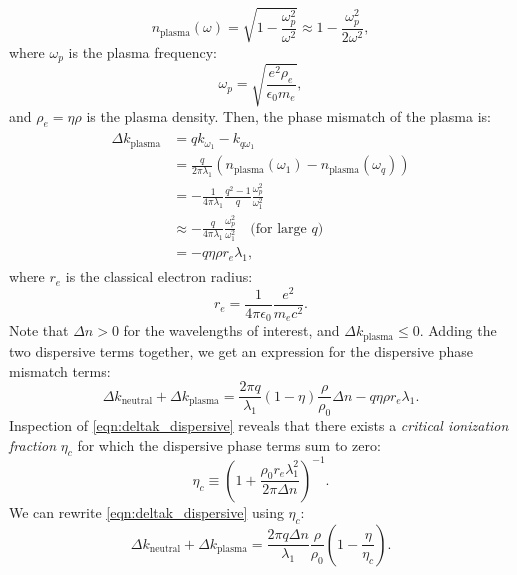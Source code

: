 \begin{equation}
n_{\textrm{plasma}}(\omega) = \sqrt{1 - \frac{\omega_p^2}{\omega^2}} \approx 1 - \frac{\omega_p^2}{2 \omega^2},
\end{equation}
where $\omega_p$ is the plasma frequency:
\begin{equation}
\omega_p = \sqrt{\frac{e^2 \rho_e}{\epsilon_0 m_e}},
\end{equation} and $\rho_e = \eta \rho$ is the plasma density. Then, the phase mismatch of the plasma is:
\begin{align}
\begin{split}
\Delta k_{\textrm{plasma}} &= q k_{\omega_1} - k_{q \omega_1} \\
&= \frac{q}{2 \pi \lambda_1} (n_{\textrm{plasma}}(\omega_1) -n_{\textrm{plasma}}(\omega_q) ) \\
&= - \frac{1}{4 \pi \lambda_1} \frac{q^2-1}{q} \frac{\omega_p^2}{\omega_1^2} \\
&\approx - \frac{q}{4 \pi \lambda_1} \frac{\omega_p^2}{\omega_1^2} \quad \textrm{(for large $q$)} \\
&= - q \eta \rho  r_e \lambda_1,
\end{split}
\end{align}
where $r_e$ is the classical electron radius:
\begin{equation}
r_e = \frac{1}{4 \pi \epsilon_0} \frac{e^2}{m_e c^2}.
\end{equation}
Note that $\Delta n > 0$ for the wavelengths of interest, and $\Delta k_{\textrm{plasma}} \le 0$. Adding the two dispersive terms together, we get an expression for the dispersive phase mismatch terms:
\begin{equation}
\Delta k_{\textrm{neutral}} + \Delta k_{\textrm{plasma}} = \frac{2 \pi q}{\lambda_1} (1-\eta) \frac{\rho}{\rho_0}\Delta n - q \eta \rho  r_e \lambda_1.
\label{eqn:deltak_dispersive}
\end{equation}
Inspection of \cref{eqn:deltak_dispersive} reveals that there exists a \textit{critical ionization fraction} $\eta_c$ for which the dispersive phase terms sum to zero:
\begin{equation}
\eta_c \equiv \left( 1+ \frac{\rho_0 r_e \lambda_1^2}{2 \pi \Delta n} \right)^{-1}.
\end{equation}
We can rewrite \cref{eqn:deltak_dispersive} using $\eta_c$:
\begin{equation}
\Delta k_{\textrm{neutral}} + \Delta k_{\textrm{plasma}} = \frac{2 \pi q \Delta n}{\lambda_1} \frac{\rho}{\rho_0} \left(1 - \frac{\eta}{\eta_c}\right).
\end{equation}

